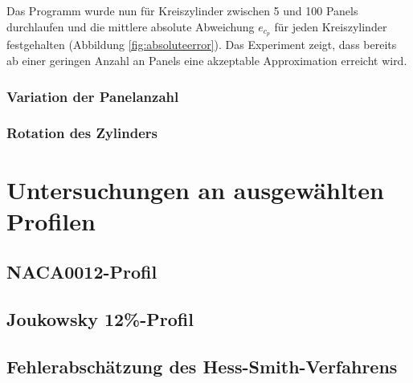 Das Programm wurde nun für Kreiszylinder zwischen 5 und 100 Panels durchlaufen und die mittlere absolute Abweichung $e_{c_p}$ für jeden Kreiszylinder festgehalten (Abbildung \ref{fig:absoluteerror}). Das Experiment zeigt, dass bereits ab einer geringen Anzahl an Panels eine akzeptable Approximation erreicht wird.


\subsubsection{Variation der Panelanzahl}
\subsubsection{Rotation des Zylinders}
\section{Untersuchungen an ausgewählten Profilen}
\subsection{NACA0012-Profil}
\subsection{Joukowsky 12\%-Profil}
\subsection{Fehlerabschätzung des Hess-Smith-Verfahrens}




\newpage
